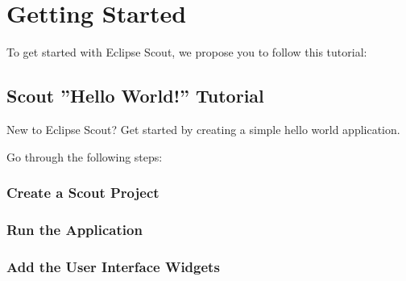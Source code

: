 \documentclass[a4paper,10pt,twoside]{book}
\begin{document}
\thispagestyle{empty}
\frontmatter




\pagestyle{plain}

\sloppy

\mainmatter


\pagestyle{headings}

\chapter*{Getting Started}

To get started with Eclipse Scout, we propose you to follow this tutorial:

\section{Scout ''Hello World!'' Tutorial}

New to Eclipse Scout? Get started by creating a simple hello world application.

Go through the following steps:

\subsection{Create a Scout Project}

\subsection{Run the Application}

\subsection{Add the User Interface Widgets}

\end{document}
